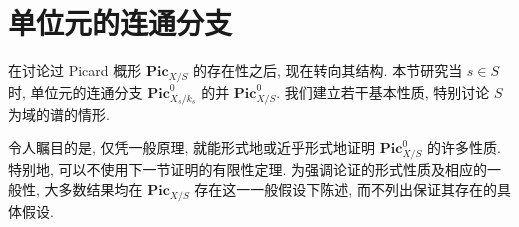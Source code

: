 \section{单位元的连通分支}\label{ch09s05}
在讨论过 Picard 概形 $\mathbf{Pic}_{X/S}$ 的存在性之后, 现在转向其结构. 本节研究当 $s\in S$ 时, 单位元的连通分支 $\mathbf{Pic}^0_{X_s/k_s}$ 的并 $\mathbf{Pic}^0_{X/S}$. 我们建立若干基本性质, 特别讨论 $S$ 为域的谱的情形.

令人瞩目的是, 仅凭一般原理, 就能形式地或近乎形式地证明 $\mathbf{Pic}^0_{X/S}$ 的许多性质. 特别地, 可以不使用下一节证明的有限性定理. 为强调论证的形式性质及相应的一般性, 大多数结果均在 $\mathbf{Pic}_{X/S}$ 存在这一一般假设下陈述, 而不列出保证其存在的具体假设.

